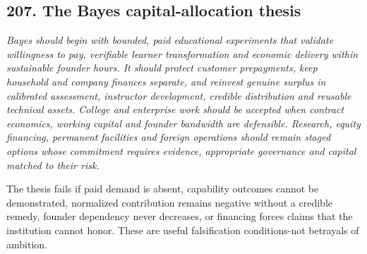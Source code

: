 \subsection{207. The Bayes capital-allocation thesis}


\textit{Bayes should begin with bounded, paid educational experiments that validate willingness to pay, verifiable learner transformation and economic delivery within sustainable founder hours. It should protect customer prepayments, keep household and company finances separate, and reinvest genuine surplus in calibrated assessment, instructor development, credible distribution and reusable technical assets. College and enterprise work should be accepted when contract economics, working capital and founder bandwidth are defensible. Research, equity financing, permanent facilities and foreign operations should remain staged options whose commitment requires evidence, appropriate governance and capital matched to their risk.}

The thesis fails if paid demand is absent, capability outcomes cannot be demonstrated, normalized contribution remains negative without a credible remedy, founder dependency never decreases, or financing forces claims that the institution cannot honor. These are useful falsification conditions-not betrayals of ambition.

